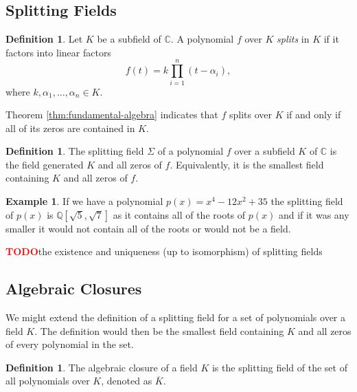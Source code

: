 \documentclass[12pt]{article}
\theoremstyle{definition}
\newtheorem{definition}[theorem]{Definition}
\newtheorem{example}[theorem]{Example}
\newcommand{\C}{\mathbb C}
\newcommand{\TODO}{\textbf{\textcolor{red}{TODO}}}
\begin{document}
\subsection{Splitting Fields}
\begin{definition}
    Let $K$ be a subfield of $\C$. A polynomial $f$ over $K$ \textit{splits} in $K$ if it factors into linear factors $$
    f(t) = k \prod _{i=1} ^n (t - \alpha_i),
    $$
    where $k, \alpha_1, \ldots, \alpha_n \in K$. 
\end{definition}
Theorem \ref{thm:fundamental-algebra} indicates that $f$ splits over $K$ if and only if all of its zeros are contained in $K$. 

\begin{definition}
    The splitting field $\Sigma$ of a polynomial $f$ over a subfield $K$ of $\C$ is the field generated $K$ and all zeros of $f$. Equivalently, it is the smallest field containing $K$ and all zeros of $f$. 
\end{definition}





    \begin{example}
    If we have a polynomial \(p(x) = x^4 - 12x^2 + 35\) the splitting field of \(p(x)\) is \(\mathbb{Q}[\sqrt{5},\sqrt{7}]\) as it contains all of the roots of \(p(x)\) and if it was any smaller it would not contain all of the roots or would not be a field.
    \end{example}

\TODO the existence and uniqueness (up to isomorphism) of splitting fields

\subsection{Algebraic Closures}
We might extend the definition of a splitting field for a set of polynomials over a field $K$. The definition would then be the smallest field containing $K$ and all zeros of every polynomial in the set. 
\begin{definition}
    The algebraic closure of a field $K$ is the splitting field of the set of all polynomials over $K$, denoted as $\overline K$. 
\end{definition}
\end{document}
